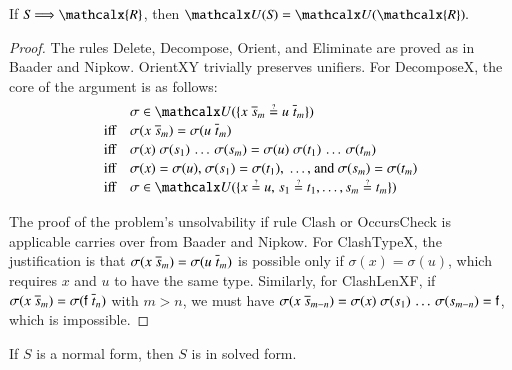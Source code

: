   \begin{lemma}\label{lemma:ehoh:unif-preserve}
    If $\mathit{S} \Unifarrow \mathcalx{R}$, then $\Unifier(\mathit{S}) = \Unifier(\mathcalx{R}).$
  \end{lemma}
  \begin{proof}
    The rules \textsf{Delete}, \textsf{Decompose}, \textsf{Orient}, and
    \textsf{Eliminate} are proved as in Baader and Nipkow.
    \textsf{OrientXY} trivially preserves unifiers.
    For \textsf{DecomposeX}, the core of the argument is as follows:
    \begin{align*}
    & \sigma \in \Unifier(\{ x \; \tuple{s}{{m}} \unif u \; \tuple{t}{{m}} \}) \\[-.5\jot]
      \text{iff}\quad
    & \sigma(x \; \tuple{s}{{m}}) = \sigma(u \; \tuple{t}{{m}}) \\[-.5\jot]
      \text{iff}\quad
    & \sigma(x) \; \sigma(s_1) \, \ldots \, \sigma(s_m)
        = \sigma(u) \; \sigma(t_1) \, \ldots \, \sigma(t_m) \\[-.5\jot]
      \text{iff}\quad
    & \sigma(x) = \sigma(u){,}~ \sigma(s_1) = \sigma(t_1){,}\; \ldots{,}~ \text{and}~ \sigma(s_m) = \sigma(t_m) \\[-.5\jot]
      \text{iff}\quad
    & \sigma \in \Unifier(\{ x \unif u{,}\; s_1 \unif t_1, \ldots, s_{m} \unif t_{m}\})
    \end{align*}

    The proof of the problem's unsolvability if rule \textsf{Clash} or
    \textsf{OccursCheck} is applicable carries over from Baader and Nipkow.
    For \textsf{ClashTypeX}, the justification is that $\sigma(x \;
    \overline{s}_{m}) = \sigma(u \; \overline{t}_{m})$ is possible only if
    $\sigma(x) = \sigma(u)$, which requires $x$ and $u$ to have the same
    type. Similarly, for \textsf{ClashLenXF}, if
    $\sigma(x \; \overline{s}_{m}) = \sigma(\mathsf{f} \; \overline{t}_{n})$ with
    $m > n$, we must have $\sigma(x \; \overline{s}_{{m-n}}) =
    \sigma(x) \; \sigma(s_1) \, \dots \, \sigma(s_{m-n}) = \mathsf{f}$,
    which is impossible.
  \end{proof}
\newpage
  \begin{lemma}\label{lemma:ehoh:unif-normal-imp-solved}
    If $\mathit{S}$ is a normal form, then $\mathit{S}$ is in solved form.
  \end{lemma}
